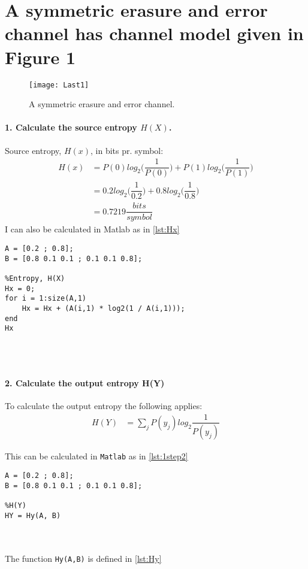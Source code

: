 \documentclass[Main]{subfiles}
\begin{document}
\section{A symmetric erasure and error channel has channel model
given in Figure 1}
\begin{figure}[H]
\centering
\texttt{[image: Last1]}
\caption{ A symmetric erasure and error channel.}
\end{figure}


\paragraph{1. Calculate the source entropy $H(X)$.}

Source entropy, $H(x)$, in bits pr. symbol:
\begin{align}
H(x) &= P(0) log_2\bigg(\dfrac{1}{P(0)}\bigg) + P(1) log_2\bigg(\dfrac{1}{P(1)}\bigg)\\
	&= 0.2 log_2\bigg(\dfrac{1}{0.2}\bigg) + 0.8 log_2\bigg(\dfrac{1}{0.8}\bigg)\\
	&= 0.7219 \dfrac{bits}{symbol}
\end{align}
I can also be calculated in Matlab as in \codeTitle \ref{lst:Hx}

\begin{lstlisting}[caption=Source entropy, style=Code-Matlab, label=lst:Hx]
A = [0.2 ; 0.8];
B = [0.8 0.1 0.1 ; 0.1 0.1 0.8];

%Entropy, H(X)
Hx = 0;
for i = 1:size(A,1)
    Hx = Hx + (A(i,1) * log2(1 / A(i,1)));
end
Hx 
\end{lstlisting}
\\
\\
\paragraph{2.  Calculate the output entropy H(Y)}
To calculate the output entropy the following applies:
\begin{align}
H(Y) &= \sum_j P(y_j)log_2 \dfrac{1}{P(y_j)}
\end{align}

This can be calculated in \texttt{Matlab} as in \codeTitle \ref{lst:1step2}

\begin{lstlisting}[caption=H(Y), style=Code-Matlab, label=lst:1step2]
A = [0.2 ; 0.8];
B = [0.8 0.1 0.1 ; 0.1 0.1 0.8];

%H(Y)
HY = Hy(A, B)
\end{lstlisting}
\\
\\
The function \texttt{Hy(A,B)} is defined in \codeTitle \ref{lst:Hy}
\end{document}
